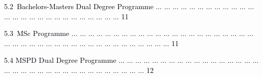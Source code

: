 \documentclass[12pt]{article}
\begin{document}
\vspace{\baselineskip}
\begin{adjustwidth}{0.21in}{0.0in}
{\fontsize{7pt}{8.4pt}\selectfont \textcolor[HTML]{00000A}{5.2\ Bachelors-Masters Dual Degree Programme $ \ldots $ $ \ldots $ $ \ldots $ $ \ldots $ $ \ldots $ $ \ldots $ $ \ldots $ $ \ldots $ $ \ldots $ $ \ldots $ $ \ldots $ $ \ldots $ $ \ldots $ $ \ldots $ $ \ldots $ $ \ldots $ $ \ldots $ $ \ldots $ $ \ldots $ $ \ldots $ $ \ldots $ $ \ldots $ $ \ldots $ $ \ldots $ $ \ldots $ $ \ldots $   11}\par}\par

\end{adjustwidth}


\vspace{\baselineskip}
\begin{adjustwidth}{0.21in}{0.0in}
{\fontsize{7pt}{8.4pt}\selectfont \textcolor[HTML]{00000A}{5.3\ MSc Programme $ \ldots $ $ \ldots $ $ \ldots $ $ \ldots $ $ \ldots $ $ \ldots $ $ \ldots $ $ \ldots $ $ \ldots $ $ \ldots $ $ \ldots $ $ \ldots $ $ \ldots $ $ \ldots $ $ \ldots $ $ \ldots $ $ \ldots $ $ \ldots $ $ \ldots $ $ \ldots $ $ \ldots $ $ \ldots $ $ \ldots $ $ \ldots $ $ \ldots $ $ \ldots $ $ \ldots $ $ \ldots $ $ \ldots $ $ \ldots $ $ \ldots $ $ \ldots $ $ \ldots $ $ \ldots $ $ \ldots $ $ \ldots $ $ \ldots $ $ \ldots $ $ \ldots $ $ \ldots $ $ \ldots $ $ \ldots $   11}\par}\par

\end{adjustwidth}


\vspace{\baselineskip}
\begin{adjustwidth}{0.21in}{0.0in}
{\fontsize{7pt}{8.4pt}\selectfont \textcolor[HTML]{00000A}{5.4 MSPD Dual Degree Programme $ \ldots $ $ \ldots $ $ \ldots $ $ \ldots $ $ \ldots $ $ \ldots $ $ \ldots $ $ \ldots $ $ \ldots $ $ \ldots $ $ \ldots $ $ \ldots $ $ \ldots $ $ \ldots $ $ \ldots $ $ \ldots $ $ \ldots $ $ \ldots $ $ \ldots $ $ \ldots $ $ \ldots $ $ \ldots $ $ \ldots $ $ \ldots $ $ \ldots $ $ \ldots $ $ \ldots $ $ \ldots $ $ \ldots $ $ \ldots $ $ \ldots $ $ \ldots $ $ \ldots $ $ \ldots $  12}\par}\par

\end{adjustwidth}
\end{document}
